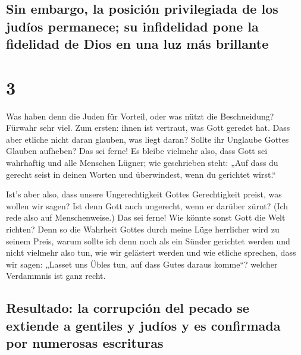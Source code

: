 \hypertarget{sin-embargo-la-posiciuxf3n-privilegiada-de-los-juduxedos-permanece-su-infidelidad-pone-la-fidelidad-de-dios-en-una-luz-muxe1s-brillante}{%
\subsection{Sin embargo, la posición privilegiada de los judíos
permanece; su infidelidad pone la fidelidad de Dios en una luz más
brillante}\label{sin-embargo-la-posiciuxf3n-privilegiada-de-los-juduxedos-permanece-su-infidelidad-pone-la-fidelidad-de-dios-en-una-luz-muxe1s-brillante}}

\hypertarget{section-2}{%
\section{3}\label{section-2}}

 Was haben denn die Juden für Vorteil, oder was nützt die
Beschneidung?  Fürwahr sehr viel. Zum ersten: ihnen ist
vertraut, was Gott geredet hat.  Dass aber etliche nicht
daran glauben, was liegt daran? Sollte ihr Unglaube Gottes Glauben
aufheben?  Das sei ferne! Es bleibe vielmehr also, dass
Gott sei wahrhaftig und alle Menschen Lügner; wie geschrieben steht:
„Auf dass du gerecht seist in deinen Worten und überwindest, wenn du
gerichtet wirst.``

 Ist's aber also, dass unsere Ungerechtigkeit Gottes
Gerechtigkeit preist, was wollen wir sagen? Ist denn Gott auch
ungerecht, wenn er darüber zürnt? (Ich rede also auf Menschenweise.)
 Das sei ferne! Wie könnte sonst Gott die Welt richten?
 Denn so die Wahrheit Gottes durch meine Lüge herrlicher
wird zu seinem Preis, warum sollte ich denn noch als ein Sünder
gerichtet werden  und nicht vielmehr also tun, wie wir
gelästert werden und wie etliche sprechen, dass wir sagen: „Lasset uns
Übles tun, auf dass Gutes daraus komme``? welcher Verdammnis ist ganz
recht.

\hypertarget{resultado-la-corrupciuxf3n-del-pecado-se-extiende-a-gentiles-y-juduxedos-y-es-confirmada-por-numerosas-escrituras}{%
\subsection{Resultado: la corrupción del pecado se extiende a gentiles y
judíos y es confirmada por numerosas
escrituras}\label{resultado-la-corrupciuxf3n-del-pecado-se-extiende-a-gentiles-y-juduxedos-y-es-confirmada-por-numerosas-escrituras}}

